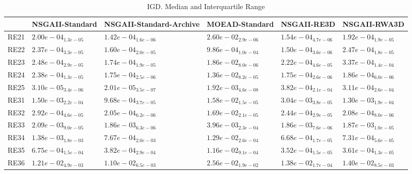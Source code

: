 \documentclass{article}
\begin{document}
\begin{table}
\caption{IGD. Median and Interquartile Range}
\label{table: IGD}
\centering
\begin{scriptsize}
\begin{tabular}{llllll}
\hline & NSGAII-Standard & NSGAII-Standard-Archive & MOEAD-Standard & NSGAII-RE3D &  NSGAII-RWA3D\\
\hline 
RE21 & $  2.00e-04_{ 1.3e-05}$ & \cellcolor{gray95}$  1.42e-04_{ 1.6e-06}$ & $  2.60e-02_{ 2.9e-06}$ & \cellcolor{gray25}$  1.54e-04_{ 4.7e-06}$ & $  1.92e-04_{ 1.9e-05}$ \\
RE22 & $  2.37e-04_{ 3.3e-05}$ & \cellcolor{gray25}$  1.60e-04_{ 2.0e-05}$ & $  9.86e-04_{ 1.0e-04}$ & \cellcolor{gray95}$  1.50e-04_{ 3.6e-06}$ & $  2.47e-04_{ 1.8e-05}$ \\
RE23 & $  2.48e-04_{ 2.9e-05}$ & \cellcolor{gray95}$  1.74e-04_{ 1.9e-05}$ & $  1.86e-02_{ 8.0e-06}$ & \cellcolor{gray25}$  2.22e-04_{ 4.6e-05}$ & $  3.37e-04_{ 1.4e-04}$ \\
RE24 & $  2.38e-04_{ 1.3e-05}$ & \cellcolor{gray95}$  1.75e-04_{ 2.5e-06}$ & $  1.36e-02_{ 8.2e-05}$ & \cellcolor{gray25}$  1.75e-04_{ 2.6e-06}$ & $  1.86e-04_{ 6.0e-06}$ \\
RE25 & \cellcolor{gray25}$  3.10e-05_{ 3.4e-06}$ & \cellcolor{gray95}$  2.01e-05_{ 3.5e-07}$ & $  1.92e-03_{ 4.6e-08}$ & $  3.82e-04_{ 2.1e-04}$ & $  3.11e-04_{ 2.6e-04}$ \\
RE31 & $  1.50e-03_{ 2.2e-04}$ & \cellcolor{gray95}$  9.68e-04_{ 3.7e-05}$ & $  1.58e-02_{ 1.5e-05}$ & $  3.04e-03_{ 3.8e-05}$ & \cellcolor{gray25}$  1.30e-03_{ 1.9e-04}$ \\
RE32 & $  2.92e-04_{ 4.6e-05}$ & \cellcolor{gray95}$  2.05e-04_{ 6.2e-06}$ & $  1.69e-02_{ 2.1e-05}$ & $  2.44e-04_{ 2.9e-05}$ & \cellcolor{gray25}$  2.08e-04_{ 8.0e-06}$ \\
RE33 & $  2.09e-03_{ 9.0e-05}$ & \cellcolor{gray25}$  1.86e-03_{ 6.3e-06}$ & $  3.96e-03_{ 2.3e-04}$ & \cellcolor{gray95}$  1.86e-03_{ 7.6e-06}$ & $  1.87e-03_{ 1.0e-05}$ \\
RE34 & $  1.38e-03_{ 1.8e-03}$ & $  7.67e-04_{ 2.0e-03}$ & $  1.29e-02_{ 2.6e-04}$ & \cellcolor{gray95}$  6.68e-04_{ 1.7e-05}$ & \cellcolor{gray25}$  7.31e-04_{ 5.6e-05}$ \\
RE35 & $  6.75e-04_{ 1.5e-04}$ & $  3.82e-04_{ 2.9e-04}$ & $  1.16e-02_{ 9.1e-04}$ & \cellcolor{gray95}$  3.52e-04_{ 1.5e-05}$ & \cellcolor{gray25}$  3.61e-04_{ 1.3e-05}$ \\
RE36 & \cellcolor{gray25}$  1.21e-02_{ 4.9e-03}$ & \cellcolor{gray95}$  1.10e-02_{ 6.5e-03}$ & $  2.56e-02_{ 1.9e-02}$ & $  1.38e-02_{ 1.7e-04}$ & $  1.40e-02_{ 8.5e-03}$ \\

\end{tabular}
\end{scriptsize}
\end{table}
\end{document}
